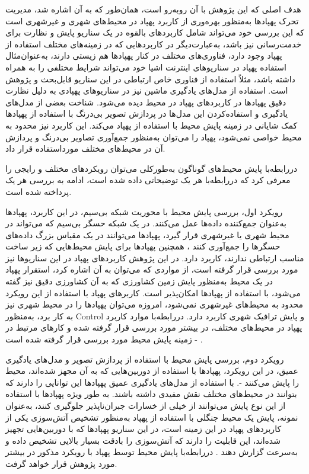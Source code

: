 هدف اصلی که این پژوهش با آن روبه‌رو است، همان‌طور که به آن اشاره شد، مدیریت تحرک پهپادها به‌منظور بهره‌وری از کاربرد پهپاد در محیط‌های شهری و غیرشهری است که این بررسی خود می‌تواند شامل کاربردهای بالقوه در یک سناریو پایش و نظارت برای خدمت‌رسانی نیز باشد، به‌عبارت‌دیگر در کاربردهایی که در زمینه‌های مختلف استفاده از پهپاد وجود دارد، فناوری‌های مختلف در کنار پهپادها هم زیستی دارند، به‌عنوان‌مثال استفاده پهپاد در سناریوهای اینترنت اشیا خود می‌تواند شرایط مختلفی را به همراه داشته باشد، مثلاً استفاده از فناوری خاص ارتباطی در این سناریو قابل‌بحث و پژوهش است. استفاده از مدل‌های یادگیری ماشین نیز در سناریوهای پهپادی به دلیل نظارت دقیق پهپادها در کاربردهای پهپاد در محیط دیده می‌شود. شناخت بعضی از مدل‌های یادگیری و استفاده‌کردن این مدل‌ها در پردازش تصویر بی‌درنگ با استفاده از پهپادها کمک شایانی در زمینه پایش محیط با استفاده از پهپاد می‌کند. این کاربرد نیز محدود به محیط خواصی نمی‌شود، پهپاد را می‌توان به‌منظور جمع‌آوری تصاویر بی‌درنگ و پردازش آن در محیط‌های مختلف مورداستفاده قرار داد.



دررابطه‌با پایش محیط‌های گوناگون به‌طورکلی می‌توان رویکردهای مختلف و رایجی را معرفی کرد که دررابطه‌با هر یک توضیحاتی داده شده است، ادامه به بررسی هر یک پرداخته شده است.

رویکرد اول، بررسی پایش محیط با محوریت شبکه بی‌سیم، در این کاربرد، پهپادها به‌عنوان جمع‌کننده داده‌ها عمل می‌کنند. در یک شبکه حسگر بی‌سیم که می‌تواند در محیط شهری یا غیرشهری قرار گیرد، پهپادها می‌توانند در یک مقیاس بزرگ داده‌های حسگرها را جمع‌آوری کنند \cite{Zhang2020}، همچنین پهپادها برای پایش محیط‌هایی که زیر ساخت مناسب ارتباطی ندارند، کاربرد دارد. در این پژوهش کاربردهای پهپاد در این سناریوها نیز مورد بررسی قرار گرفته است، از مواردی که می‌توان به آن اشاره کرد، استقرار پهپاد در یک محیط به‌منظور پایش زمین کشاورزی که به آن کشاورزی دقیق نیز گفته می‌شود، با استفاده از پهپادها امکان‌پذیر است. کاربرهای پهپاد با استفاده از این رویکرد محدود به محیط‌های غیرشهری نمی‌شود، امروزه می‌توان پهپادها را در محیط شهری نیز به کار برد، به‌منظور \gls{Control} و پایش ترافیک شهری کاربرد دارد. دررابطه‌با موارد کاربرد پهپاد در محیط‌های مختلف، در بیشتر مورد بررسی قرار گرفته شده و کارهای مرتبط در زمینه پایش محیط مورد بررسی قرار گرفته شده است\cite{Tan2021} - \cite{Ma2021}.

رویکرد دوم، بررسی پایش محیط با استفاده از پردازش تصویر و مدل‌های یادگیری عمیق، در این رویکرد، پهپادها با استفاده از دوربین‌هایی که به آن مجهز شده‌اند، محیط را پایش می‌کنند\cite{Yilmaz2020} -\cite{Kannadaguli2020}. با استفاده از مدل‌های یادگیری عمیق پهپادها این توانایی را دارند که بتوانند در محیط‌های مختلف نقش مفیدی داشته باشند. به طور ویژه پهپادها با استفاده از این نوع پایش می‌توانند از خیلی از خسارات جبران‌ناپذیر جلوگیری کنند، به‌عنوان نمونه، پایش یک محیط جنگلی با استفاده از پهپاد به‌منظور تشخیص آتش‌سوزی یکی از کاربردهای پهپاد در این زمینه است، در این سناریو پهپادها که با دوربین‌هایی تجهیز شده‌اند، این قابلیت را دارند که آتش‌سوزی را بادقت بسیار بالایی تشخیص داده و به‌سرعت گزارش دهند \cite{Jiao2020}. دررابطه‌با پایش محیط توسط پهپاد با رویکرد مذکور در بیشتر مورد پژوهش قرار خواهد گرفت.


